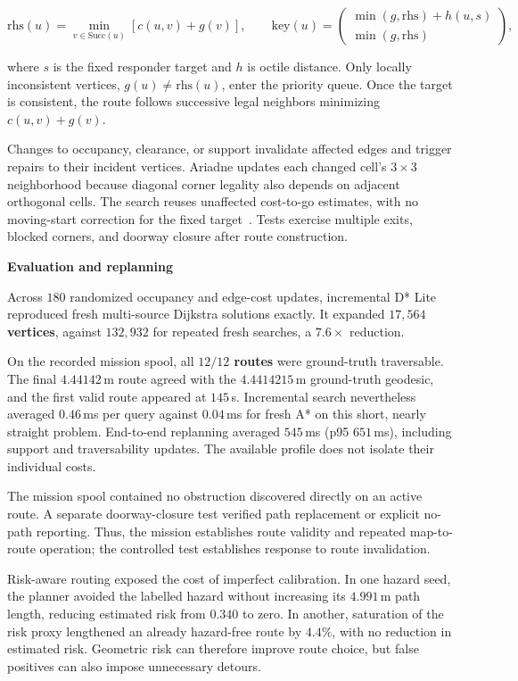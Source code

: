 \documentclass[10pt,a4paper]{article}
\newcommand{\indentedheading}[1]{\par\addvspace{0.65em}\noindent\hspace*{1em}\textbf{#1}\par\smallskip}
\begin{document}
\begin{equation}
\mathrm{rhs}(u)=
\min_{v\in\mathrm{Succ}(u)}
\left[c(u,v)+g(v)\right],
\qquad
\mathrm{key}(u)=
\begin{pmatrix}
\min(g,\mathrm{rhs})+h(u,s)\\
\min(g,\mathrm{rhs})
\end{pmatrix},
\label{eq:egress-dstar}
\end{equation}

where $s$ is the fixed responder target and $h$ is octile distance.
Only locally inconsistent vertices, $g(u)\neq\mathrm{rhs}(u)$,
enter the priority queue. Once the target is consistent, the route
follows successive legal neighbors minimizing $c(u,v)+g(v)$.

Changes to occupancy, clearance, or support invalidate affected
edges and trigger repairs to their incident vertices. Ariadne
updates each changed cell's $3\times3$ neighborhood because diagonal
corner legality also depends on adjacent orthogonal cells.
The search reuses unaffected cost-to-go estimates, with no
moving-start correction for the fixed target~\cite{dstar2002}.
Tests exercise multiple exits, blocked corners, and doorway
closure after route construction.

\indentedheading{Evaluation and replanning}

Across $180$ randomized occupancy and edge-cost updates, incremental
D* Lite reproduced fresh multi-source Dijkstra solutions exactly.
It expanded \textbf{$17{,}564$ vertices}, against $132{,}932$
for repeated fresh searches, a $7.6\times$ reduction.

On the recorded mission spool, all \textbf{$12/12$ routes} were
ground-truth traversable. The final $4.44142$\,m route agreed with
the $4.4414215$\,m ground-truth geodesic, and the first valid route
appeared at $145$\,s. Incremental search nevertheless averaged
$0.46$\,ms per query against $0.04$\,ms for fresh A* on this short,
nearly straight problem. End-to-end replanning averaged $545$\,ms
(p95 $651$\,ms), including support and traversability updates.
The available profile does not isolate their individual costs.

The mission spool contained no obstruction discovered directly
on an active route. A separate doorway-closure test verified path
replacement or explicit no-path reporting. Thus, the mission
establishes route validity and repeated map-to-route operation;
the controlled test establishes response to route invalidation.

Risk-aware routing exposed the cost of imperfect calibration.
In one hazard seed, the planner avoided the labelled hazard
without increasing its $4.991$\,m path length, reducing estimated
risk from $0.340$ to zero. In another, saturation of the risk
proxy lengthened an already hazard-free route by $4.4\%$, with no
reduction in estimated risk. Geometric risk can therefore improve
route choice, but false positives can also impose unnecessary
detours.
\end{document}
